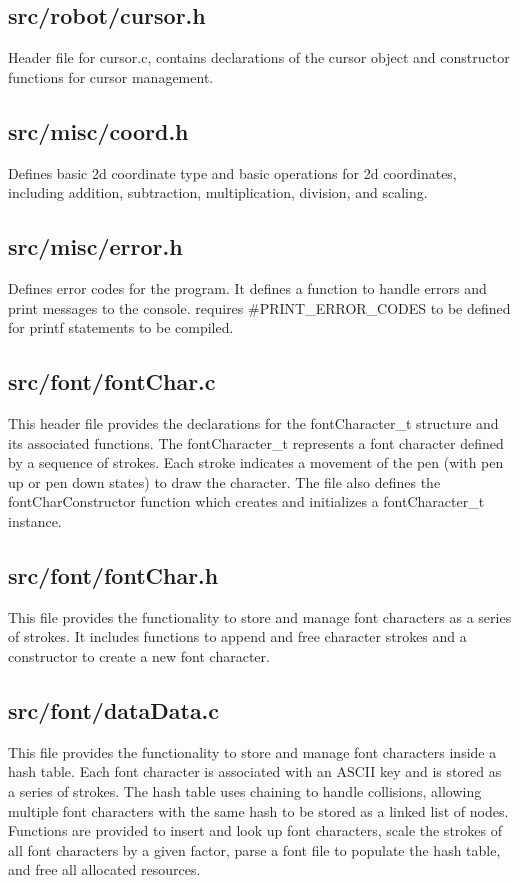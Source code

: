 \subsection{src/robot/cursor.h}
Header file for cursor.c, contains declarations of the cursor object and constructor functions for cursor management.

\subsection{src/misc/coord.h}
Defines basic 2d coordinate type and basic operations for 2d coordinates, including addition, subtraction, multiplication, division, and scaling.
\subsection{src/misc/error.h}
Defines error codes for the program. It defines a function to handle errors and print messages to the console. requires \#PRINT\_ERROR\_CODES to be defined for printf statements to be compiled.

\subsection{src/font/fontChar.c}
This header file provides the declarations for the fontCharacter\_t structure and its associated functions. The fontCharacter\_t represents a font character defined by a sequence of strokes. Each stroke indicates a movement of the pen (with pen up or pen down states) to draw the character. The file also defines the fontCharConstructor function which creates and initializes a fontCharacter\_t instance.
\subsection{src/font/fontChar.h}
This file provides the functionality to store and manage font characters as a series of strokes. It includes functions to append and free character strokes and a constructor to create a new font character.

\subsection{src/font/dataData.c}
This file provides the functionality to store and manage font characters inside a hash table. Each font character is associated with an ASCII key and is stored as a series of strokes. The hash table uses chaining to handle collisions, allowing multiple font characters with the same hash to be stored as a linked list of nodes. Functions are provided to insert and look up font characters, scale the strokes of all font characters by a given factor, parse a font file to populate the hash table, and free all allocated resources.
